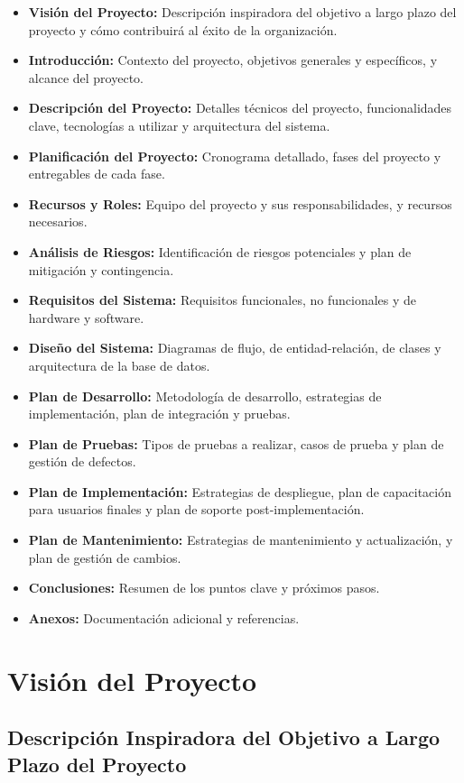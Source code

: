\documentclass{article}
\begin{document}
\begin{itemize}
    \item \textbf{Visión del Proyecto:} Descripción inspiradora del objetivo a largo plazo del proyecto y cómo contribuirá al éxito de la organización.
    \item \textbf{Introducción:} Contexto del proyecto, objetivos generales y específicos, y alcance del proyecto.
    \item \textbf{Descripción del Proyecto:} Detalles técnicos del proyecto, funcionalidades clave, tecnologías a utilizar y arquitectura del sistema.
    \item \textbf{Planificación del Proyecto:} Cronograma detallado, fases del proyecto y entregables de cada fase.
    \item \textbf{Recursos y Roles:} Equipo del proyecto y sus responsabilidades, y recursos necesarios.
    \item \textbf{Análisis de Riesgos:} Identificación de riesgos potenciales y plan de mitigación y contingencia.
    \item \textbf{Requisitos del Sistema:} Requisitos funcionales, no funcionales y de hardware y software.
    \item \textbf{Diseño del Sistema:} Diagramas de flujo, de entidad-relación, de clases y arquitectura de la base de datos.
    \item \textbf{Plan de Desarrollo:} Metodología de desarrollo, estrategias de implementación, plan de integración y pruebas.
    \item \textbf{Plan de Pruebas:} Tipos de pruebas a realizar, casos de prueba y plan de gestión de defectos.
    \item \textbf{Plan de Implementación:} Estrategias de despliegue, plan de capacitación para usuarios finales y plan de soporte post-implementación.
    \item \textbf{Plan de Mantenimiento:} Estrategias de mantenimiento y actualización, y plan de gestión de cambios.
    \item \textbf{Conclusiones:} Resumen de los puntos clave y próximos pasos.
    \item \textbf{Anexos:} Documentación adicional y referencias.
\end{itemize}

\section{Visión del Proyecto}

\subsection{Descripción Inspiradora del Objetivo a Largo Plazo del Proyecto}
\end{document}
